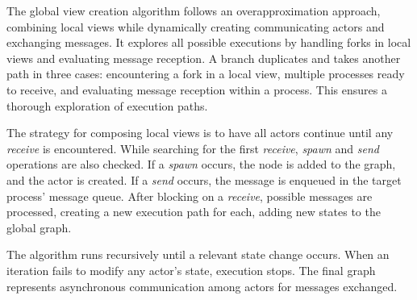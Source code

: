 The global view creation algorithm follows an overapproximation approach,  
combining local views while dynamically creating communicating actors and  
exchanging messages. It explores all possible executions by handling forks in  
local views and evaluating message reception. A branch duplicates and takes  
another path in three cases: encountering a fork in a local view, multiple  
processes ready to receive, and evaluating message reception within a process.  
This ensures a thorough exploration of execution paths.  

The strategy for composing local views is to have all actors continue until  
any \textit{receive} is encountered. While searching for the first \textit{receive},  
\textit{spawn} and \textit{send} operations are also checked. If a \textit{spawn}  
occurs, the node is added to the graph, and the actor is created. If a  
\textit{send} occurs, the message is enqueued in the target process' message  
queue. After blocking on a \textit{receive}, possible messages are processed,  
creating a new execution path for each, adding new states to the global graph.  

The algorithm runs recursively until a relevant state change occurs. When an  
iteration fails to modify any actor's state, execution stops. The final graph  
represents asynchronous communication among actors for messages exchanged.  
